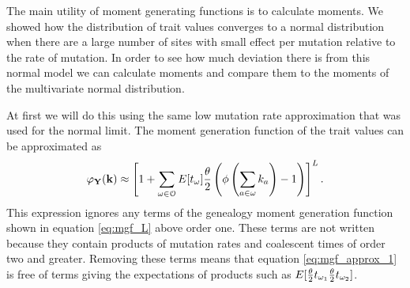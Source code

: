 The main utility of moment generating functions is to calculate moments. We
showed how the distribution of trait values converges to a normal distribution
when there are a large number of sites with small effect per mutation relative
to the rate of mutation. In order to see how much deviation there is from this
normal model we can calculate moments and compare them to the moments of the
multivariate normal distribution.

At first we will do this using the same low mutation rate approximation that was
used for the normal limit. The moment generation function of the trait values can 
be approximated as
\begin{equation}
  \label{eq:mgf_approx_1}
  \varphi_{\mathbf{Y}}(\mathbf{k}) \approx \left[ 1 + \sum_{\omega \in \mathcal{O}}
    E[t_\omega] \frac{\theta}{2} \left( \phi\left( \sum_{a \in \omega} k_a\right) -1 \right) \right]^L.
\end{equation}
This expression ignores any terms of the genealogy moment generation function
shown in equation \ref{eq:mgf_L} above order one. These terms are not written
because they contain products of mutation rates and coalescent times of order
two and greater. Removing these terms means that equation \ref{eq:mgf_approx_1}
is free of terms giving the expectations of products such as $E[\frac{\theta}{2} t_{\omega_1}
  \frac{\theta}{2} t_{\omega_2}]$.

